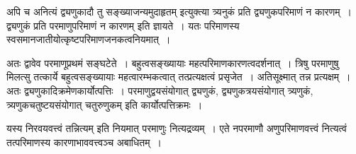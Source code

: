 {अपि च अनित्यं द्व्यणुकादौ तु सङ्ख्याजन्यमुदाहृतम् इत्युक्त्या त्र्यनुकं प्रति द्व्यणुकपरिमाणं न कारणम्~। द्व्यणुकं प्रति परमाणुपरिमाणं न कारणम् इति ज्ञायते~। यतः परिमाणस्य स्वसमानजातीयोत्कृष्टपरिमाणजनकत्वनियमात्~। 

अतः द्वावेव परमाणूप्रथमं सङ्घटेते~। बहुत्वसङ्ख्यायाः महत्परिमाणकारणत्वदर्शनात्~। त्रिषु परमाणुषु मिलत्सु तत्कार्ये बहुत्वसङ्ख्यायाः महत्वारम्भकत्वात् तत्प्रत्यक्षत्वं प्रसृजेत~। अतिसूक्ष्मात् तन्न प्रत्यक्षम्~। अतः द्व्यणुकादिक्रमेणकार्योत्पत्तिः~। परमाणुद्वयसंयोगात् द्व्यणुकं, द्व्यणुकत्रयसंयोगात् त्र्यणुकं, त्र्यणुकचतुष्टयसंयोगात् चतुरुणुकम् इति कार्योत्पत्तिक्रमः~। 

यस्य निरवयवत्त्वं तन्नित्यम् इति नियमात् परमाणुः नित्यद्रव्यम्~। एते नपरमाणौ अणुपरिमाणवत्त्वं नित्यत्वं तत्परिमाणस्य कारणाभाववत्त्वञ्च अबाधितम्~। 

\articleend
}
